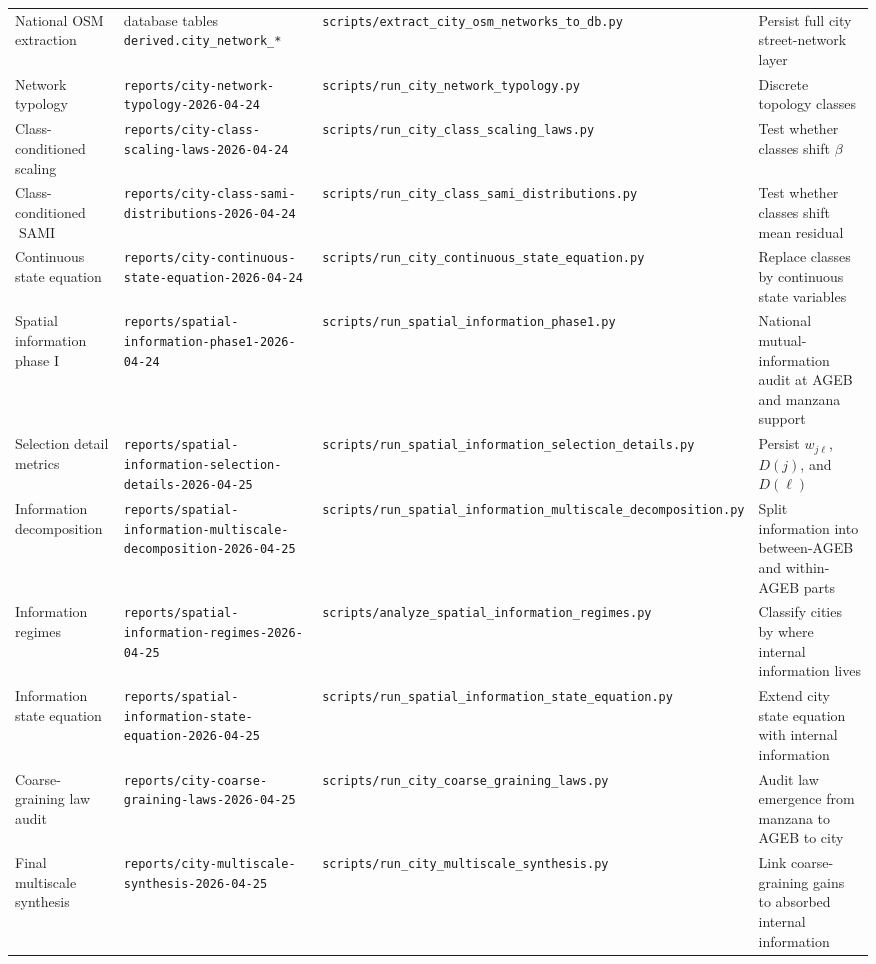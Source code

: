 \documentclass[11pt]{article}
\newcommand{\SAMI}{\operatorname{SAMI}}
\begin{document}
\begin{landscape}
\begin{longtable}{p{}p{}p{}p{}}
National OSM extraction & database tables \texttt{derived.city\_network\_*} & \texttt{scripts/extract\_city\_osm\_networks\_to\_db.py} & Persist full city street-network layer \\
Network typology & \texttt{reports/city-network-typology-2026-04-24} & \texttt{scripts/run\_city\_network\_typology.py} & Discrete topology classes \\
Class-conditioned scaling & \texttt{reports/city-class-scaling-laws-2026-04-24} & \texttt{scripts/run\_city\_class\_scaling\_laws.py} & Test whether classes shift \(\beta\) \\
Class-conditioned \(\SAMI\) & \texttt{reports/city-class-sami-distributions-2026-04-24} & \texttt{scripts/run\_city\_class\_sami\_distributions.py} & Test whether classes shift mean residual \\
Continuous state equation & \texttt{reports/city-continuous-state-equation-2026-04-24} & \texttt{scripts/run\_city\_continuous\_state\_equation.py} & Replace classes by continuous state variables \\
Spatial information phase I & \texttt{reports/spatial-information-phase1-2026-04-24} & \texttt{scripts/run\_spatial\_information\_phase1.py} & National mutual-information audit at AGEB and manzana support \\
Selection detail metrics & \texttt{reports/spatial-information-selection-details-2026-04-25} & \texttt{scripts/run\_spatial\_information\_selection\_details.py} & Persist \(w_{j\ell}\), \(D(j)\), and \(D(\ell)\) \\
Information decomposition & \texttt{reports/spatial-information-multiscale-decomposition-2026-04-25} & \texttt{scripts/run\_spatial\_information\_multiscale\_decomposition.py} & Split information into between-AGEB and within-AGEB parts \\
Information regimes & \texttt{reports/spatial-information-regimes-2026-04-25} & \texttt{scripts/analyze\_spatial\_information\_regimes.py} & Classify cities by where internal information lives \\
Information state equation & \texttt{reports/spatial-information-state-equation-2026-04-25} & \texttt{scripts/run\_spatial\_information\_state\_equation.py} & Extend city state equation with internal information \\
Coarse-graining law audit & \texttt{reports/city-coarse-graining-laws-2026-04-25} & \texttt{scripts/run\_city\_coarse\_graining\_laws.py} & Audit law emergence from manzana to AGEB to city \\
Final multiscale synthesis & \texttt{reports/city-multiscale-synthesis-2026-04-25} & \texttt{scripts/run\_city\_multiscale\_synthesis.py} & Link coarse-graining gains to absorbed internal information \\
\bottomrule
\end{longtable}
\end{landscape}
\end{document}
